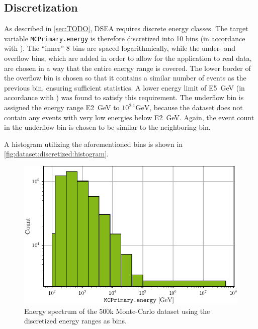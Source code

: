 \subsection{Discretization}
As described in \autoref{sec:TODO}, DSEA requires discrete energy classes.
The target variable \texttt{MCPrimary.energy} is therefore discretized into \num{10} bins
(in accordance with \cite{dsea_samuel}).
%
The \enquote{inner} \num{8} bins are spaced logarithmically,
  while the under- and overflow bins,
    which are added in order to allow for the application to real data,
  are chosen in a way that the entire energy range is covered.
%
The lower border of the overflow bin is chosen so that it contains a similar number of events as the previous bin,
ensuring sufficient statistics.
A lower energy limit of \SI{E5}{\giga\electronvolt} (in accordance with \cite{dsea_samuel}) was found to satisfy this requirement.
%
The underflow bin is assigned the energy range \SI{E2}{\giga\electronvolt} to $10^{2.1} \si{\giga\electronvolt}$,
because the dataset does not contain any events with very low energies below \SI{E2}{\giga\electronvolt}.
Again, the event count in the underflow bin is chosen to be similar to the neighboring bin.

A histogram utilizing the aforementioned bins is shown in \autoref{fig:dataset:discretized:histogram}.

\begin{figure}
  \centering
  \includegraphics[scale=1]{content/plots/dataset_500k:discretized:histogram_full.pdf}
  \caption{Energy spectrum of the 500k Monte-Carlo dataset using the discretized energy ranges as bins.}
  \label{fig:dataset:discretized:histogram}
\end{figure}


